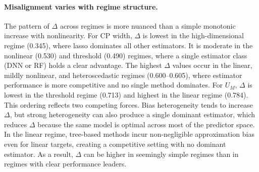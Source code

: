 \documentclass[pdflatex,sn-mathphys-ay]{sn-jnl}%
\theoremstyle{thmstyleone}%
\theoremstyle{thmstyletwo}%
\theoremstyle{thmstylethree}%
\begin{document}
\paragraph{Misalignment varies with regime structure.}
The pattern of $\Delta$ across regimes is more nuanced than a simple monotonic increase with nonlinearity. For CP width, $\Delta$ is lowest in the high-dimensional regime (0.345), where lasso dominates all other estimators. It is moderate in the nonlinear (0.530) and threshold (0.490) regimes, where a single estimator class (DNN or RF) holds a clear advantage. The highest $\Delta$ values occur in the linear, mildly nonlinear, and heteroscedastic regimes (0.600--0.605), where estimator performance is more competitive and no single method dominates. For $U_M$, $\Delta$ is lowest in the threshold regime (0.713) and highest in the linear regime (0.784). This ordering reflects two competing forces. Bias heterogeneity tends to increase $\Delta$, but strong heterogeneity can also produce a single dominant estimator, which reduces $\Delta$ because the same model is optimal across most of the predictor space. In the linear regime, tree-based methods incur non-negligible approximation bias even for linear targets, creating a competitive setting with no dominant estimator. As a result, $\Delta$ can be higher in seemingly simple regimes than in regimes with clear performance leaders.
\end{document}
